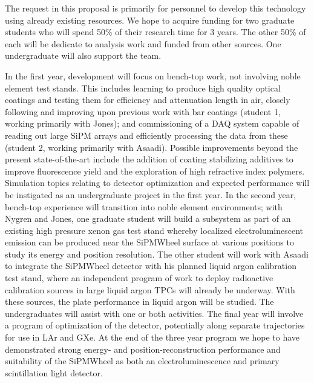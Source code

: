 
The request in this proposal is primarily for personnel to develop this technology using already existing resources.  We hope to acquire funding for two graduate students who will spend 50\% of their research time for 3 years.  The other 50\% of each will be dedicate to analysis work and funded from other sources.   One undergraduate will also support the team.

In the first year, development will focus on bench-top work, not involving noble element test stands.   This includes learning to produce high quality optical coatings and testing them for efficiency and attenuation length in air, closely following and improving upon previous work with bar coatings (student 1, working primarily with Jones); and commissioning  of a DAQ system capable of reading out large SiPM arrays and efficiently processing the data from these (student 2, working primarily with Asaadi).  Possible improvements beyond the present state-of-the-art include the addition of coating stabilizing additives to improve fluorescence yield and the exploration of high refractive index polymers. Simulation topics relating to detector optimization and expected performance will be instigated as an undergraduate project in the first year.  In the second year, bench-top experience will transition into noble element environments;  with Nygren and Jones, one graduate student will build a subsystem as part of an existing high pressure xenon gas test stand whereby localized electroluminescent emission can be produced near the SiPMWheel surface at various positions to study its energy and position resolution.   The other student will work with Asaadi to integrate the SiPMWheel detector with his planned liquid argon calibration test stand, where an independent program of work to deploy radioactive calibration sources in large liquid argon TPCs will already be underway.  With these sources, the plate performance in liquid argon will be studied.  The undergraduates will assist with one or both activities.  The final year will involve a program of optimization of the detector, potentially along separate trajectories for use in LAr and GXe.  At the end of the three year program we hope to have demonstrated strong energy- and position-reconstruction performance and suitability of the SiPMWheel as both an electroluminescence and primary scintillation light detector.
